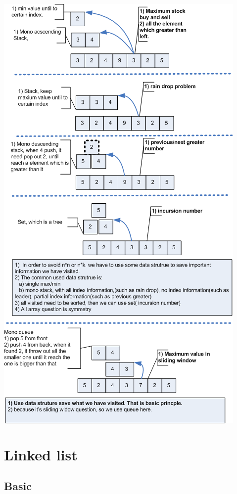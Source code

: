 \documentclass[a4paper,11pt,twoside]{book}
\begin{document}
\begin{center}
	\includegraphics[scale=0.64]{pics/array.png} \newline
\end{center}
	
\section{Linked list}
\subsection{Basic}
\end{document}
